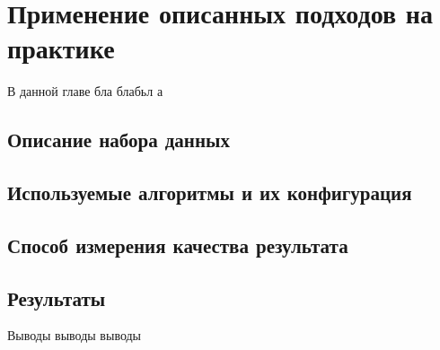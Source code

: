 \chapter{Применение описанных подходов на практике}

В данной главе бла блабьл а

\section{Описание набора данных}

\section{Используемые алгоритмы и их конфигурация}

\section{Способ измерения качества результата}

\section{Результаты}

\chapterconclusion

Выводы выводы выводы
